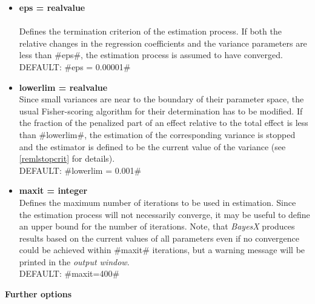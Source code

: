 \begin{itemize}
\item {\bf eps = realvalue } \\
\\Defines the termination criterion of the estimation process. If
both the relative changes in the regression coefficients and the
variance parameters are less than #eps#, the estimation process is
assumed to have converged.\\
DEFAULT: #eps = 0.00001#

\item {\bf lowerlim = realvalue } \\
Since small variances are near to the boundary of their parameter
space, the usual Fisher-scoring algorithm for their determination
has to be modified. If the fraction of the penalized part of an
effect relative to the total effect is less than #lowerlim#, the
estimation of the corresponding variance is stopped and the
estimator is defined to be the current value of the variance (see
\autoref{remlstopcrit} for details).\\
DEFAULT: #lowerlim = 0.001#

\item {\bf maxit = integer } \\
Defines the maximum number of iterations to be used in estimation.
Since the estimation process will not necessarily converge, it may
be useful to define an upper bound for the number of iterations.
Note, that {\it BayesX} produces results based on the current
values of all parameters even if no convergence could be achieved
within #maxit# iterations, but a warning message will be printed
in the {\it output window}.\\
DEFAULT: #maxit=400#

\end{itemize}

{\bf Further options} \label{remlreg further options}

